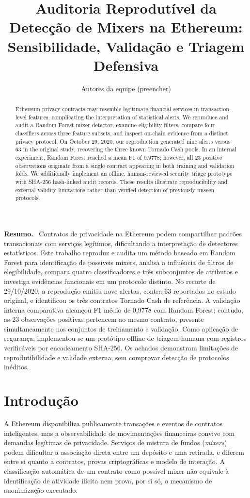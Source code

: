 \documentclass[12pt]{article}
\title{Auditoria Reprodutível da Detecção de Mixers na Ethereum: Sensibilidade, Validação e Triagem Defensiva}
\author{Autores da equipe (preencher)\inst{1}}
\newenvironment{resumo}{\par\noindent\textbf{Resumo.}\ }{\par}
\begin{document}
\maketitle
\begin{resumo}
Contratos de privacidade na Ethereum podem compartilhar padrões transacionais com serviços legítimos, dificultando a interpretação de detectores estatísticos. Este trabalho reproduz e audita um método baseado em Random Forest para identificação de possíveis mixers, analisa a influência de filtros de elegibilidade, compara quatro classificadores e três subconjuntos de atributos e investiga evidências funcionais em um protocolo distinto. No recorte de 29/10/2020, a reprodução emitiu nove alertas, contra 63 reportados no estudo original, e identificou os três contratos Tornado Cash de referência. A validação interna comparativa alcançou F1 médio de 0,9778 com Random Forest; contudo, as 23 observações positivas pertencem ao mesmo contrato, presente simultaneamente nos conjuntos de treinamento e validação. Como aplicação de segurança, implementou-se um protótipo offline de triagem humana com registros verificáveis por encadeamento SHA-256. Os achados demonstram limitações de reprodutibilidade e validade externa, sem comprovar detecção de protocolos inéditos.
\end{resumo}
\begin{abstract}
Ethereum privacy contracts may resemble legitimate financial services in transaction-level features, complicating the interpretation of statistical alerts. We reproduce and audit a Random Forest mixer detector, examine eligibility filters, compare four classifiers across three feature subsets, and inspect on-chain evidence from a distinct privacy protocol. On October 29, 2020, our reproduction generated nine alerts versus 63 in the original study, recovering the three known Tornado Cash pools. In an internal experiment, Random Forest reached a mean F1 of 0.9778; however, all 23 positive observations originate from a single contract appearing in both training and validation folds. We additionally implement an offline, human-reviewed security triage prototype with SHA-256 hash-linked audit records. These results illustrate reproducibility and external-validity limitations rather than verified detection of previously unseen protocols.
\end{abstract}

\section{Introdução}
A Ethereum disponibiliza publicamente transações e eventos de contratos inteligentes, mas a observabilidade de movimentações financeiras convive com demandas legítimas de privacidade. Serviços de mistura de fundos (\emph{mixers}) podem dificultar a associação direta entre um depósito e uma retirada, e diferem entre si quanto a contratos, provas criptográficas e modelo de interação. A classificação automática de um contrato como possível mixer não equivale à identificação de atividade ilícita nem prova, por si só, o mecanismo de anonimização executado.
\end{document}
